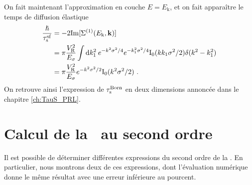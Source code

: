 On fait maintenant l'approximation en couche $E=E_{\mathrm{k}}$, et on fait apparaître le temps de diffusion élastique
\begin{align}
\frac{\hslash}{\tau_{\mathrm{s}}^{\mathrm{sf}}}&=-2\mathrm{Im}[\Sigma^{(1)}(E_{\mathrm{k}},\mathbf{k})] \\
&= \pi \frac{V_{\mathrm{R}}^2}{E_{\sigma}} \int{\mathop{}\mathopen{}\mathrm{d}k_{\mathrm{1}}^2 \: e^{-k^2\sigma^2 /4} e^{-k_{\mathrm{1}}^2\sigma^2/4} \mathrm{I_0}(k k_{\mathrm{1}} \sigma^2 /2) \delta(k^2-k_{\mathrm{1}}^2)} \\
&= \pi \frac{V_{\mathrm{R}}^2}{E_{\sigma}} e^{-k^2\sigma^2/2} \mathrm{I_0}(k^2\sigma^2/2) \text{ .}
\end{align}
On retrouve ainsi l'expression de $\tau_{\mathrm{s}}^{\mathrm{Born}}$ en deux dimensions annoncée dans le chapitre \ref{ch:TauS_PRL}.






\section{Calcul de la \selfenergy\ au second ordre}
Il est possible de déterminer différentes expressions du second ordre de la \selfenergy . En particulier, nous montrons deux de ces expressions, dont l'évaluation numérique donne le même résultat avec une erreur inférieure au pourcent. 

